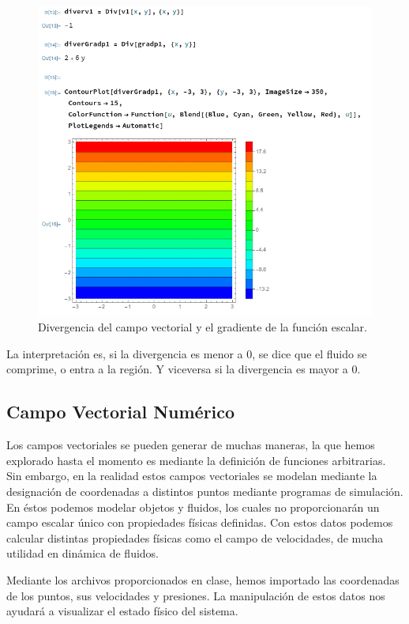 \documentclass[12pt, letterpaper]{article}
\begin{document}
\begin{figure}[H]
	\centering
	\includegraphics[width=\textwidth]{6.png}
	\caption{Divergencia del campo vectorial y el gradiente de la función escalar.}
\end{figure}

La interpretación es, si la divergencia es menor a 0, se dice que el fluido se comprime, o entra a la región. Y viceversa si la divergencia es mayor a 0.

\subsection*{Campo Vectorial Numérico}
Los campos vectoriales se pueden generar de muchas maneras, la que hemos explorado hasta el momento es mediante la definición de funciones arbitrarias. Sin embargo, en la realidad estos campos vectoriales se modelan mediante la designación de coordenadas a distintos puntos mediante programas de simulación. En éstos podemos modelar objetos y fluidos, los cuales no proporcionarán un campo escalar único con propiedades físicas definidas. Con estos datos podemos calcular distintas propiedades físicas como el campo de velocidades, de mucha utilidad en dinámica de fluidos.

Mediante los archivos proporcionados en clase, hemos importado las coordenadas de los puntos, sus velocidades y presiones. La manipulación de estos datos nos ayudará a visualizar el estado físico del sistema.
\end{document}
